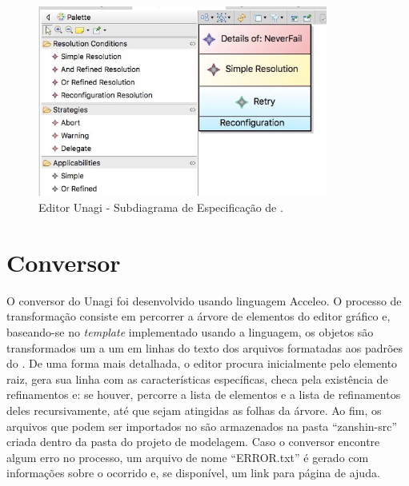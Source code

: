 \begin{figure}
	\centering
	\includegraphics[width=0.85\textwidth]{figuras/unagi/unagisubdiagrama.jpg}
	\caption{Editor Unagi - Subdiagrama de Especificação de \evoreqs.}
	\label{figura-subdiagrama-awreq}
\end{figure}

\section{Conversor}

O conversor do Unagi foi desenvolvido usando linguagem Acceleo. O processo de transformação consiste em percorrer a árvore de elementos do editor gráfico e, baseando-se no \textit{template} implementado usando a linguagem, os objetos são transformados um a um em linhas do texto dos arquivos \xml formatadas aos padrões do \zanshin. De uma forma mais detalhada, o editor procura inicialmente pelo elemento raiz, gera sua linha com as características específicas, checa pela existência de refinamentos e: se houver, percorre a lista de elementos e a lista de refinamentos deles recursivamente, até que sejam atingidas as folhas da árvore. Ao fim, os arquivos que podem ser importados no \zanshin são armazenados na pasta ``zanshin-src'' criada dentro da pasta do projeto de modelagem. Caso o conversor encontre algum erro no processo, um arquivo de nome ``ERROR.txt'' é gerado com informações sobre o ocorrido e, se disponível, um link para página de ajuda.